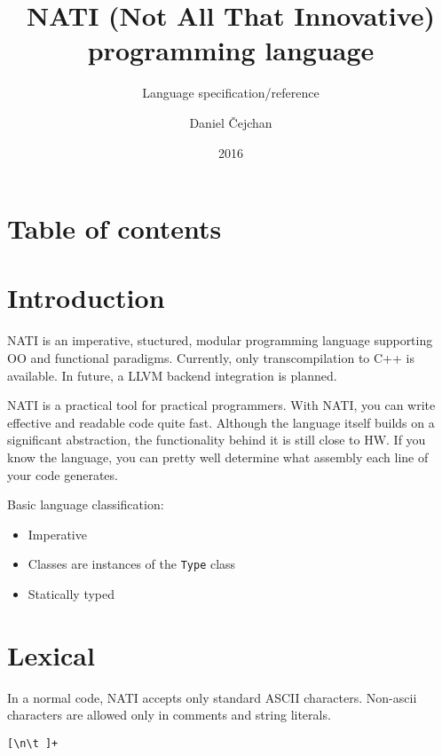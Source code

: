 




\setlength\extrarowheight{2pt}

\title{NATI (Not All That Innovative) programming language}
\subtitle{Language specification/reference}
\author{Daniel Čejchan}
\date{2016}



\mainpage

\chapter{Table of contents}
\makeatletter
{}
\makeatother

\chapter{Introduction}
NATI is an imperative, stuctured, modular programming language supporting OO and functional paradigms. Currently, only transcompilation to C++ is available. In future, a LLVM backend integration is planned.

NATI is a practical tool for practical programmers. With NATI, you can write effective and readable code quite fast. Although the language itself builds on a significant abstraction, the functionality behind it is still close to HW. If you know the language, you can pretty well determine what assembly each line of your code generates.

Basic language classification:
\begin{itemize}
	\item Imperative
	\item Classes are instances of the \verb|Type| class
	\item Statically typed
\end{itemize}

\chapter{Lexical}
In a normal code, NATI accepts only standard ASCII characters. Non-ascii characters are allowed only in comments and string literals.

\begin{grammar}
	 \verb|[\n\t ]+|
\end{grammar}

